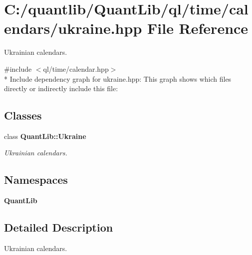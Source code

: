 \section{C\+:/quantlib/\+Quant\+Lib/ql/time/calendars/ukraine.hpp File Reference}
\label{ukraine_8hpp}


Ukrainian calendars.  


{\ttfamily \#include $<$ql/time/calendar.\+hpp$>$}\\*
Include dependency graph for ukraine.\+hpp\+:
This graph shows which files directly or indirectly include this file\+:
\subsection*{Classes}
\begin{DoxyCompactItemize}
\item 
class {\bf Quant\+Lib\+::\+Ukraine}
\begin{DoxyCompactList}\small\item\em Ukrainian calendars. \end{DoxyCompactList}\end{DoxyCompactItemize}
\subsection*{Namespaces}
\begin{DoxyCompactItemize}
\item 
 {\bf Quant\+Lib}
\end{DoxyCompactItemize}


\subsection{Detailed Description}
Ukrainian calendars. 


